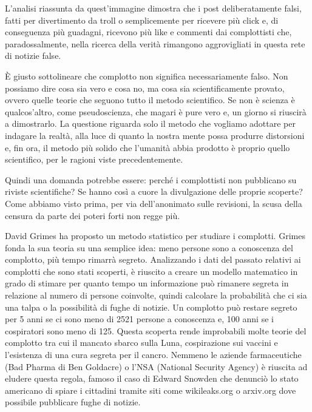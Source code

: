 \documentclass[12pt]{book} %
\begin{document}
\begin{mdframed}[linewidth=1pt]
L'analisi riassunta da quest'immagine dimostra che i post deliberatamente
falsi, fatti per divertimento da troll o semplicemente per ricevere più click e, di conseguenza più guadagni, ricevono
più like e commenti dai complottisti che, paradossalmente, nella ricerca della verità rimangono aggrovigliati in questa
rete di notizie false.

È giusto sottolineare che complotto non significa necessariamente falso. Non possiamo dire cosa sia vero e cosa no, ma
cosa sia scientificamente provato, ovvero quelle teorie che seguono tutto il metodo scientifico. Se non è scienza è
qualcos'altro, come pseudoscienza, che magari è pure vero e, un giorno si riuscirà a dimostrarlo. 
La questione riguarda solo il metodo che vogliamo adottare per indagare la realtà, alla luce di quanto la
nostra mente possa produrre distorsioni e, fin ora, il metodo più solido che l'umanità abbia
prodotto è proprio quello scientifico, per le ragioni viste precedentemente.

Quindi una domanda potrebbe essere: perché i complottisti non pubblicano su riviste scientifiche? Se hanno così a cuore
la divulgazione delle proprie scoperte? Come abbiamo visto prima, per via dell'anonimato sulle
revisioni, la scusa della censura da parte dei poteri forti non regge più. 


David Grimes ha proposto un metodo statistico per studiare i
complotti. Grimes fonda la sua
teoria su una semplice idea: meno persone sono a conoscenza del complotto, più tempo rimarrà segreto.
Analizzando i dati del passato relativi ai complotti che sono stati scoperti, è riuscito a creare un modello matematico
in grado di stimare per quanto tempo un informazione può rimanere segreta in relazione al numero di persone coinvolte,
quindi calcolare la probabilità che ci sia una talpa o la possibilità di fughe di notizie.
Un complotto può restare segreto per 5 anni se ci sono meno di 2521 persone a conoscenza e, 100 anni se i cospiratori
sono meno di 125.
Questa scoperta rende improbabili molte teorie del complotto tra cui il mancato sbarco sulla Luna, cospirazione sui vaccini e l'esistenza di una cura segreta per il cancro.
Nemmeno le aziende farmaceutiche (Bad Pharma di Ben
Goldacre) o
l'NSA (National Security Agency) è riuscita ad eludere questa regola, famoso il caso di Edward
Snowden che denunciò lo stato americano di spiare i cittadini tramite siti come wikileaks.org o arxiv.org dove
possibile pubblicare fughe di notizie.


\end{mdframed}
\end{document}
